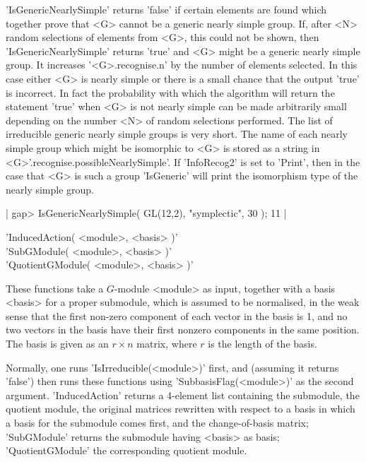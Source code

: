 'IsGenericNearlySimple' returns  'false'  if certain elements  are  found
which together  prove  that <G> cannot be a  generic nearly simple group.
If, after  <N> random selections of elements from <G>, this could not  be
shown,  then  'IsGenericNearlySimple' returns 'true' and  <G> might  be a
generic  nearly simple group.   It  increases  '<G>.recognise.n'  by  the
number of elements selected.  In this case either <G> is nearly simple or
there is a small chance that the output 'true' is incorrect.  In fact the
probability with  which the algorithm will return  the  statement  'true'
when <G> is not nearly  simple can be made arbitrarily small depending on
the number <N> of random selections  performed.  The list  of irreducible
generic  nearly  simple groups  is very  short.  The name of each  nearly
simple group  which might be isomorphic to <G> is  stored as a  string in
<G>'.recognise.possibleNearlySimple'.  If 'InfoRecog2' is set to 'Print',
then  in  the case  that <G> is such  a  group 'IsGeneric' will print the
isomorphism type of the nearly simple group.

|   gap> IsGenericNearlySimple( GL(12,2), "symplectic", 30 );
    11 |



%
%
%

'InducedAction( <module>, <basis> )' \\
'SubGModule( <module>, <basis> )'\\
'QuotientGModule( <module>, <basis> )'

These functions take   a $G$-module <module>  as  input, together with  a
basis <basis> for a proper submodule,  which is assumed to be normalised,
in the weak sense that the first non-zero component of each vector in the
basis is 1,  and no  two vectors in  the  basis have their  first nonzero
components in the same position.   The basis is given as  an $r \times n$
matrix, where $r$ is the length of the basis.

Normally, one  runs  'IsIrreducible(<module>)'  first, and  (assuming  it
returns 'false') then runs these functions using 'SubbasisFlag(<module>)'
as the second    argument.   'InducedAction' returns a  4-element    list
containing the   submodule,  the quotient module, the   original matrices
rewritten with  respect to  a  basis in which a   basis for the submodule
comes  first, and  the  change-of-basis matrix; 'SubGModule' returns  the
submodule having  <basis> as  basis; 'QuotientGModule'  the corresponding
quotient module.


